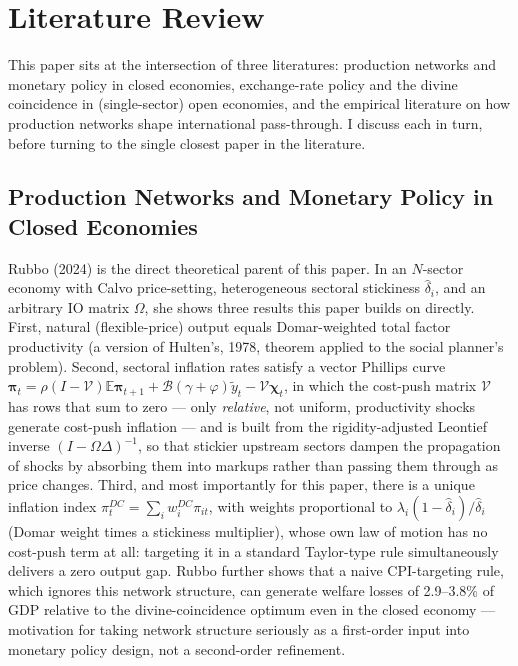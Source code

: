 \documentclass[12pt]{article}
\begin{document}
\section{Literature Review}
\label{sec:litreview}

This paper sits at the intersection of three literatures: production networks and monetary policy in
closed economies, exchange-rate policy and the divine coincidence in (single-sector) open economies,
and the empirical literature on how production networks shape international pass-through. I discuss
each in turn, before turning to the single closest paper in the literature.

\subsection{Production Networks and Monetary Policy in Closed Economies}

Rubbo (2024) is the direct theoretical parent of this paper. In an $N$-sector economy with Calvo
price-setting, heterogeneous sectoral stickiness $\hat\delta_i$, and an arbitrary IO matrix $\Omega$,
she shows three results this paper builds on directly. First, natural (flexible-price) output equals
Domar-weighted total factor productivity (a version of Hulten's, 1978, theorem applied to the social
planner's problem). Second, sectoral inflation rates satisfy a vector Phillips curve
$\bm\pi_t = \rho(I-\mathcal V)\mathbb E\bm\pi_{t+1} + \mathcal B(\gamma+\varphi)\tilde y_t -
\mathcal V\bm\chi_t$, in which the cost-push matrix $\mathcal V$ has rows that sum to zero --- only
\emph{relative}, not uniform, productivity shocks generate cost-push inflation --- and is built from
the rigidity-adjusted Leontief inverse $(I-\Omega\Delta)^{-1}$, so that stickier upstream sectors
dampen the propagation of shocks by absorbing them into markups rather than passing them through as
price changes. Third, and most importantly for this paper, there is a unique inflation index
$\pi_t^{DC}=\sum_i w_i^{DC}\pi_{it}$, with weights proportional to $\lambda_i(1-\hat\delta_i)/\hat\delta_i$
(Domar weight times a stickiness multiplier), whose own law of motion has no cost-push term at all:
targeting it in a standard Taylor-type rule simultaneously delivers a zero output gap. Rubbo further
shows that a naive CPI-targeting rule, which ignores this network structure, can generate welfare
losses of 2.9--3.8\% of GDP relative to the divine-coincidence optimum even in the closed economy ---
motivation for taking network structure seriously as a first-order input into monetary policy design,
not a second-order refinement.
\end{document}
